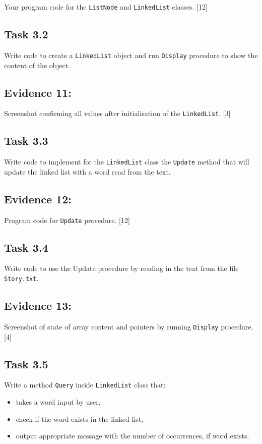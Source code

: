 Your program code for the \texttt{ListNode} and \texttt{LinkedList}
classes. \hfill{}{[}12{]}

\subsection*{Task 3.2}

Write code to create a \texttt{LinkedList} object and run \texttt{Display}
procedure to show the content of the object. 

\subsection*{Evidence 11: }

Screenshot confirming all values after initialisation of the \texttt{LinkedList}.\hfill{}
{[}3{]}

\subsection*{Task 3.3 }

Write code to implement for the \texttt{LinkedList} class the \texttt{Update}
method that will update the linked list with a word read from the
text. 

\subsection*{Evidence 12:}

Program code for \texttt{Update} procedure. \hfill{}{[}12{]}

\subsection*{Task 3.4 }

Write code to use the Update procedure by reading in the text from
the file \texttt{Story.txt}. 

\subsection*{Evidence 13:}

Screenshot of state of array content and pointers by running \texttt{Display}
procedure. \hfill{}{[}4{]}

\subsection*{Task 3.5 }

Write a method \texttt{Query} inside \texttt{LinkedList} class that: 
\begin{itemize}
\item takes a word input by user, 
\item check if the word exists in the linked list, 
\item output appropriate message with the number of occurrences, if word
exists.
\end{itemize}


